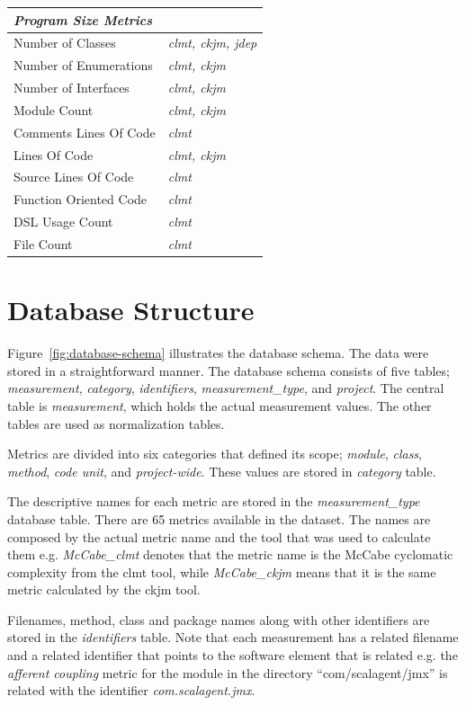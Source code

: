 \documentclass{sig-alternate}
\begin{document}
\begin{table}
\begin{tabular}{l l}
\hline
\multicolumn{2}{l}{\textit{\textbf{Program Size Metrics}}}\\
\hline
Number of Classes & \textit{clmt, ckjm, jdep}\\
Number of Enumerations & \textit{clmt, ckjm}\\
Number of Interfaces & \textit{clmt, ckjm}\\
Module Count & \textit{clmt, ckjm}\\
Comments Lines Of Code & \textit{clmt}\\
Lines Of Code & \textit{clmt, ckjm}\\
Source Lines Of Code & \textit{clmt}\\
Function Oriented Code & \textit{clmt}\\
DSL Usage Count & \textit{clmt}\\
File Count & \textit{clmt}\\
\hline
\end{tabular}
\end{table}

\section{Database Structure}
\label{sec:db}

Figure~\ref{fig:database-schema} illustrates the database schema. The data were stored in a straightforward manner. The database schema consists of five tables; \textit{measurement}, \textit{category}, \textit{identifiers}, \textit{measurement\_type}, and \textit{project}. The central table is \textit{measurement}, which holds the actual measurement values. The other tables are used as normalization tables.

Metrics are divided into six categories that defined its scope; \textit{module}, \textit{class}, \textit{method}, \textit{code unit}, and \textit{project-wide}. These values are stored in \textit{category} table.

The descriptive names for each metric are stored in the \textit{measurement\_type} database table. There are 65 metrics available in the dataset. The names are composed by the actual metric name and the tool that was used to calculate them e.g. \textit{McCabe\_clmt} denotes that the metric name is the McCabe cyclomatic complexity from the {\sc clmt} tool, while \textit{McCabe\_ckjm} means that it is the same metric calculated by the {\sc ckjm} tool.

Filenames, method, class and package names along with other identifiers are stored in the \textit{identifiers} table. Note that each measurement has a related filename and a related identifier that points to the software element that is related e.g. the \textit{afferent coupling} metric for the module in the directory ``com/scalagent/jmx'' is related with the identifier \textit{com.scalagent.jmx}.
\end{document}

